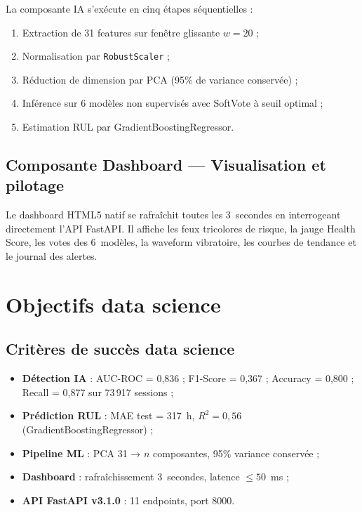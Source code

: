 \documentclass[12pt,a4paper]{report}
\begin{document}
La composante IA s'exécute en cinq étapes séquentielles :

\begin{enumerate}
  \item Extraction de 31 features sur fenêtre glissante $w=20$ ;
  \item Normalisation par \texttt{RobustScaler} ;
  \item Réduction de dimension par PCA (95\% de variance conservée) ;
  \item Inférence sur 6 modèles non supervisés avec SoftVote à seuil optimal ;
  \item Estimation RUL par GradientBoostingRegressor.
\end{enumerate}

\subsection{Composante Dashboard — Visualisation et pilotage}

Le dashboard HTML5 natif se rafraîchit toutes les 3~secondes en interrogeant directement l'API FastAPI. Il affiche les feux tricolores de risque, la jauge Health Score, les votes des 6~modèles, la waveform vibratoire, les courbes de tendance et le journal des alertes.

\section{Objectifs data science}

\subsection{Critères de succès data science}

\begin{itemize}
  \item \textbf{Détection IA} : AUC-ROC = 0,836 ; F1-Score = 0,367 ; Accuracy = 0,800 ; Recall = 0,877 sur 73\,917 sessions ;
  \item \textbf{Prédiction RUL} : MAE test = 317~h, $R^2 = 0{,}56$ (GradientBoostingRegressor) ;
  \item \textbf{Pipeline ML} : PCA 31 → $n$ composantes, 95\% variance conservée ;
  \item \textbf{Dashboard} : rafraîchissement 3~secondes, latence $\leq 50$~ms ;
  \item \textbf{API FastAPI v3.1.0} : 11 endpoints, port 8000.
\end{itemize}
\end{document}
